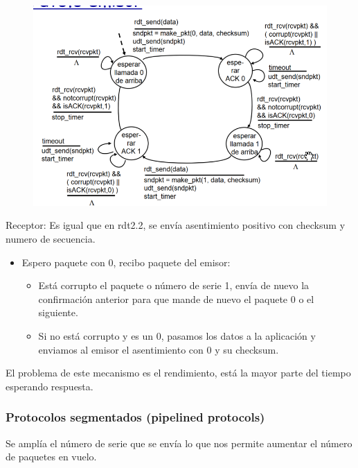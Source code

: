 \documentclass[12pt, twoside, openright]{report} %
\begin{document}
	  \begin{figure}[H]
		{\includegraphics[scale=.45]{Untitled 15.png}}
	\end{figure}
	  \pagebreak
      Receptor: Es igual que en rdt2.2, se envía asentimiento positivo
      con checksum y numero de secuencia.

      \begin{itemize}
      \item
        Espero paquete con 0, recibo paquete del emisor:

        \begin{itemize}
        \item
          Está corrupto el paquete o número de serie 1, envía de nuevo
          la confirmación anterior para que mande de nuevo el paquete 0
          o el siguiente.
        \item
          Si no está corrupto y es un 0, pasamos los datos a la
          aplicación y enviamos al emisor el asentimiento con 0 y su
          checksum.
        \end{itemize}
      \end{itemize}

	  El problema de este mecanismo es el rendimiento, está la mayor
      parte del tiempo esperando respuesta.

	  
\subsubsection{Protocolos segmentados (pipelined protocols)}

    

      Se amplía el número de serie que se envía lo que nos permite
      aumentar el número de paquetes en vuelo.
\end{document}
